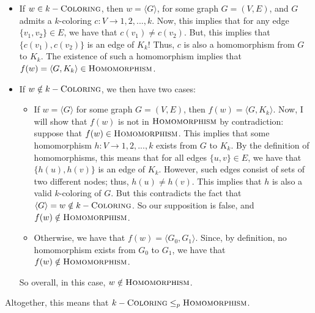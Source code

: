 \documentclass[a4paper,11pt]{scrartcl}
\newcommand{\encode}[1]{\langle #1 \rangle}
\begin{document}
\begin{itemize}
    \item If $w \in k-\textsc{Coloring}$, then $w = \encode{G}$, for some graph $G = (V, E)$, and $G$ admits a $k$-coloring $c : V \rightarrow {1, 2, ..., k}$. Now, this implies that for any edge $\{ v_1, v_2 \} \in E$, we have that $c(v_1) \neq c(v_2)$. But, this implies that $\{ c(v_1), c(v_2) \}$ is an edge of $K_k$! Thus, $c$ is also a homomorphism from $G$ to $K_k$. The existence of such a homomorphism implies that $f(w) = \encode{G, K_k} \in \textsc{Homomorphism}$.
    \item If $w \notin k-\textsc{Coloring}$, we then have two cases:
        \begin{itemize}
            \item If $w = \encode{G}$ for some graph $G = (V, E)$, then $f(w) = \encode{G, K_k}$. Now, I will show that $f(w)$ is not in $\textsc{Homomorphism}$ by contradiction: suppose that $f(w) \in \textsc{Homomorphism}$. This implies that some homomorphism $h : V \rightarrow {1, 2, ..., k}$ exists from $G$ to $K_k$. By the definition of homomorphisms, this means that for all edges $\{ u, v \} \in E$, we have that $\{ h(u), h(v) \}$ is an edge of $K_k$. However, such edges consist of sets of two different nodes; thus, $h(u) \neq h(v)$. This implies that $h$ is also a valid $k$-coloring of $G$. But this contradicts the fact that $\encode{G} = w \notin k-\textsc{Coloring}$. So our supposition is false, and $f(w) \notin \textsc{Homomorphism}$.
            \item Otherwise, we have that $f(w) = \encode{G_0, G_1}$. Since, by definition, no homomorphism exists from $G_0$ to $G_1$, we have that $f(w) \notin \textsc{Homomorphism}$.
        \end{itemize}
        So overall, in this case, $w \notin \textsc{Homomorphism}$.
\end{itemize}
Altogether, this means that $k-\textsc{Coloring} \leq_p \textsc{Homomorphism}$.
\end{document}

